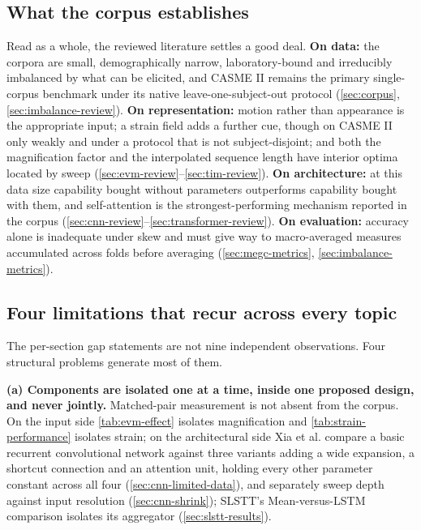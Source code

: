 \subsection{What the corpus establishes}
\label{sec:corpus-establishes}

Read as a whole, the reviewed literature settles a good deal. \textbf{On data:} the corpora are small, demographically narrow, laboratory-bound and irreducibly imbalanced by what can be elicited, and CASME II remains the primary single-corpus benchmark under its native leave-one-subject-out protocol (\autoref{sec:corpus}, \autoref{sec:imbalance-review}). \textbf{On representation:} motion rather than appearance is the appropriate input; a strain field adds a further cue, though on CASME II only weakly and under a protocol that is not subject-disjoint; and both the magnification factor and the interpolated sequence length have interior optima located by sweep (\autoref{sec:evm-review}--\autoref{sec:tim-review}). \textbf{On architecture:} at this data size capability bought without parameters outperforms capability bought with them, and self-attention is the strongest-performing mechanism reported in the corpus (\autoref{sec:cnn-review}--\autoref{sec:transformer-review}). \textbf{On evaluation:} accuracy alone is inadequate under skew and must give way to macro-averaged measures accumulated across folds before averaging (\autoref{sec:megc-metrics}, \autoref{sec:imbalance-metrics}).

\subsection{Four limitations that recur across every topic}
\label{sec:four-limitations}

The per-section gap statements are not nine independent observations. Four structural problems generate most of them.

\textbf{(a) Components are isolated one at a time, inside one proposed design, and never jointly.} Matched-pair measurement is not absent from the corpus. On the input side \autoref{tab:evm-effect} isolates magnification and \autoref{tab:strain-performance} isolates strain; on the architectural side Xia et al. compare a basic recurrent convolutional network against three variants adding a wide expansion, a shortcut connection and an attention unit, holding every other parameter constant across all four (\autoref{sec:cnn-limited-data}), and separately sweep depth against input resolution (\autoref{sec:cnn-shrink}); SLSTT's Mean-versus-LSTM comparison isolates its aggregator (\autoref{sec:slstt-results}).

